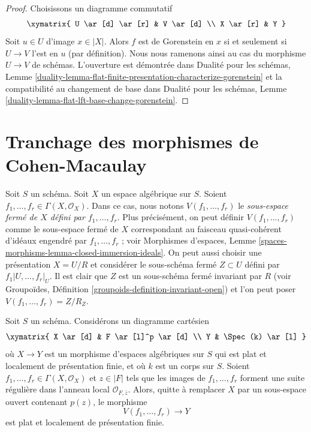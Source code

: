 \begin{proof}
Choisissons un diagramme commutatif
$$
\xymatrix{
U \ar[d] \ar[r] & V \ar[d] \\
X \ar[r] & Y
}
$$
Soit $u \in U$ d'image $x \in |X|$.
Alors $f$ est de Gorenstein en $x$ si et seulement si $U \to V$ l'est
en $u$ (par définition).
Nous nous ramenons ainsi au cas du morphisme $U \to V$
de schémas. L'ouverture est démontrée dans
Dualité pour les schémas, Lemme
\ref{duality-lemma-flat-finite-presentation-characterize-gorenstein}
et la compatibilité au changement de base dans
Dualité pour les schémas, Lemme \ref{duality-lemma-flat-lft-base-change-gorenstein}.
\end{proof}










\section{Tranchage des morphismes de Cohen-Macaulay}
\label{section-slice}

\noindent
Soit $S$ un schéma. Soit $X$ un espace algébrique sur $S$.
Soient $f_1, \ldots, f_r \in \Gamma(X, \mathcal{O}_X)$. Dans ce cas, nous
notons $V(f_1, \ldots, f_r)$ le {\it sous-espace fermé de $X$ défini par
$f_1, \ldots, f_r$}. Plus précisément, on peut définir $V(f_1, \ldots, f_r)$
comme le sous-espace fermé de $X$ correspondant au faisceau quasi-cohérent
d'idéaux engendré par $f_1, \ldots, f_r$ ; voir
Morphismes d'espaces, Lemme
\ref{spaces-morphisms-lemma-closed-immersion-ideals}.
On peut aussi choisir une présentation $X = U/R$ et considérer le
sous-schéma fermé $Z \subset U$ défini par $f_1|U, \ldots, f_r|_U$.
Il est clair que $Z$ est un sous-schéma fermé invariant par $R$ (voir
Groupoïdes, Définition \ref{groupoids-definition-invariant-open})
et l'on peut poser $V(f_1, \ldots, f_r) = Z/R_Z$.

\begin{lemma}
\label{lemma-slice}
Soit $S$ un schéma. Considérons un diagramme cartésien
$$
\xymatrix{
X \ar[d] & F \ar[l]^p \ar[d] \\
Y & \Spec(k) \ar[l]
}
$$
où $X \to Y$ est un morphisme d'espaces algébriques sur $S$
qui est plat et localement de présentation finie, et où
$k$ est un corps sur $S$. Soient $f_1, \ldots, f_r \in \Gamma(X, \mathcal{O}_X)$
et $z \in |F|$ tels que les images de $f_1, \ldots, f_r$ forment une suite régulière
dans l'anneau local $\mathcal{O}_{F, \overline{z}}$.
Alors, quitte à remplacer $X$ par un sous-espace ouvert contenant $p(z)$, le morphisme
$$
V(f_1, \ldots, f_r) \longrightarrow Y
$$
est plat et localement de présentation finie.
\end{lemma}

